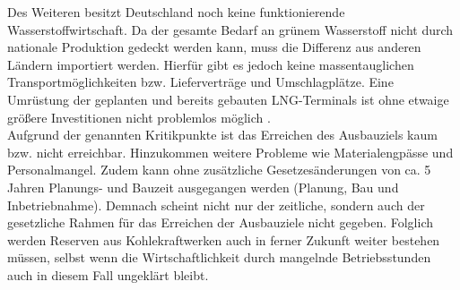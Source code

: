 	Des Weiteren besitzt Deutschland noch keine funktionierende Wasserstoffwirtschaft. 
	Da der gesamte Bedarf an grünem Wasserstoff nicht durch nationale Produktion gedeckt werden kann, muss die Differenz aus anderen Ländern importiert werden.
	Hierfür gibt es jedoch keine massentauglichen Transportmöglichkeiten bzw. Lieferverträge und Umschlagplätze.
	Eine Umrüstung der geplanten und bereits gebauten LNG-Terminals ist ohne etwaige größere Investitionen nicht problemlos möglich \cite{Frauenhofer_LNG}. \\
	
	Aufgrund der genannten Kritikpunkte ist das Erreichen des Ausbauziels kaum bzw. nicht erreichbar. Hinzukommen weitere Probleme wie Materialengpässe und Personalmangel.
	Zudem kann ohne zusätzliche Gesetzesänderungen von ca. \num{5} Jahren Planungs- und Bauzeit ausgegangen werden (Planung, Bau und Inbetriebnahme).
	Demnach scheint nicht nur der zeitliche, sondern auch der gesetzliche Rahmen für das Erreichen der Ausbauziele nicht gegeben.
	Folglich werden Reserven aus Kohlekraftwerken auch in ferner Zukunft weiter bestehen müssen, selbst wenn die Wirtschaftlichkeit durch mangelnde Betriebsstunden auch in diesem Fall ungeklärt bleibt.
	
	
	
	